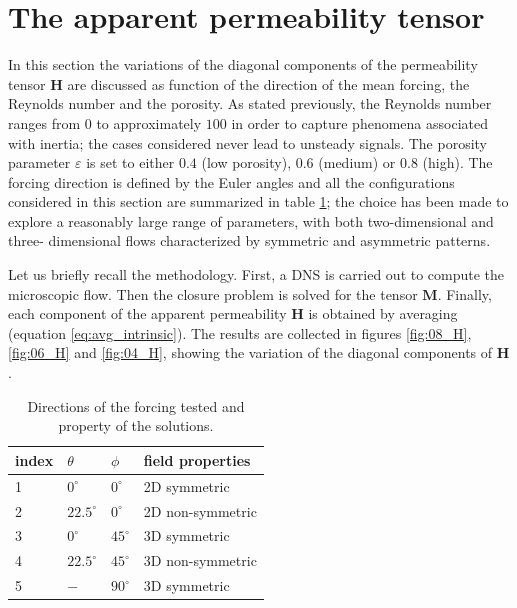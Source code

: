 \section{The apparent permeability tensor}

\label{sec:5}

In this section the variations of the diagonal components of the permeability tensor $\mathbf{H}$ are discussed as function of the direction of 
the mean forcing, the Reynolds number and  the porosity. As stated previously, the Reynolds number ranges from $0$ to approximately $100$ in 
order to capture phenomena associated with inertia; the cases considered never lead to unsteady signals. 
The porosity parameter $\varepsilon$ is set to either $0.4$ (low porosity),  $0.6$ (medium) or
$0.8$ (high). The forcing direction is defined by the Euler angles and all the configurations considered in this section are summarized in 
table \ref{table:directions}; the choice has been made to explore a reasonably large range of parameters, with both two-dimensional and three-
dimensional flows characterized by symmetric and asymmetric patterns.

Let us briefly recall the methodology. First, a DNS is carried out to compute the microscopic flow. Then the  closure problem is solved for the 
tensor $\mathbf{M}$. Finally, each component of the apparent permeability  $\mathbf{H}$  is obtained by averaging (equation 
\eqref{eq:avg_intrinsic}).
The results are collected in figures \ref{fig:08_H}, \ref{fig:06_H} and \ref{fig:04_H}, showing the variation of the diagonal components 
of $\mathbf{H}$. 


\begin{table}[t]
	\centering
	\begin{tabular}{l | l l l}
		index & $\theta$ & $\phi$ & field properties \\\hline	\hline
		1 & $0^\circ$ & $0^\circ$ & 2D symmetric \\
		2 & $22.5^\circ$ & $0^\circ$ & 2D non-symmetric \\
		3 & $0^\circ$ & $45^\circ$ & 3D symmetric \\
		4 & $22.5^\circ$ & $45^\circ$ & 3D non-symmetric \\
		5 & $-$ & $90^\circ$ & 3D symmetric \\
		\hline  
	\end{tabular}
	\caption{Directions of the forcing tested and property of the solutions.}
	\label{table:directions}
\end{table}



